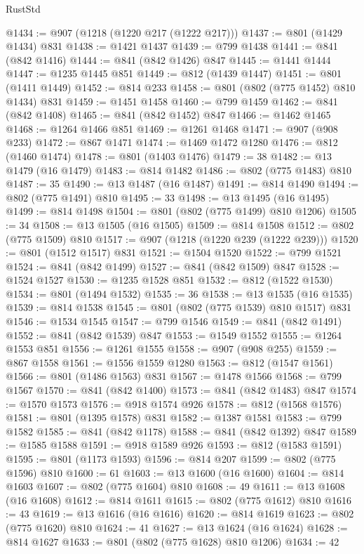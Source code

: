 \begin{lexlean}{RustStd}
\begin{coremodule}
@1434 := @907 (@1218 (@1220 @217 (@1222 @217)))
@1437 := @801 (@1429 @1434) @831
@1438 := @1421 @1437
@1439 := @799 @1438
@1441 := @841 (@842 @1416)
@1444 := @841 (@842 @1426) @847
@1445 := @1441 @1444
@1447 := @1235 @1445 @851
@1449 := @812 (@1439 @1447)
@1451 := @801 (@1411 @1449)
@1452 := @814 @233
@1458 := @801 (@802 (@775 @1452) @810 @1434) @831
@1459 := @1451 @1458
@1460 := @799 @1459
@1462 := @841 (@842 @1408)
@1465 := @841 (@842 @1452) @847
@1466 := @1462 @1465
@1468 := @1264 @1466 @851
@1469 := @1261 @1468
@1471 := @907 (@908 @233)
@1472 := @867 @1471
@1474 := @1469 @1472 @1280
@1476 := @812 (@1460 @1474)
@1478 := @801 (@1403 @1476)
@1479 := 38
@1482 := @13 @1479 (@16 @1479)
@1483 := @814 @1482
@1486 := @802 (@775 @1483) @810
@1487 := 35
@1490 := @13 @1487 (@16 @1487)
@1491 := @814 @1490
@1494 := @802 (@775 @1491) @810
@1495 := 33
@1498 := @13 @1495 (@16 @1495)
@1499 := @814 @1498
@1504 := @801 (@802 (@775 @1499) @810 @1206)
@1505 := 34
@1508 := @13 @1505 (@16 @1505)
@1509 := @814 @1508
@1512 := @802 (@775 @1509) @810
@1517 := @907 (@1218 (@1220 @239 (@1222 @239)))
@1520 := @801 (@1512 @1517) @831
@1521 := @1504 @1520
@1522 := @799 @1521
@1524 := @841 (@842 @1499)
@1527 := @841 (@842 @1509) @847
@1528 := @1524 @1527
@1530 := @1235 @1528 @851
@1532 := @812 (@1522 @1530)
@1534 := @801 (@1494 @1532)
@1535 := 36
@1538 := @13 @1535 (@16 @1535)
@1539 := @814 @1538
@1545 := @801 (@802 (@775 @1539) @810 @1517) @831
@1546 := @1534 @1545
@1547 := @799 @1546
@1549 := @841 (@842 @1491)
@1552 := @841 (@842 @1539) @847
@1553 := @1549 @1552
@1555 := @1264 @1553 @851
@1556 := @1261 @1555
@1558 := @907 (@908 @255)
@1559 := @867 @1558
@1561 := @1556 @1559 @1280
@1563 := @812 (@1547 @1561)
@1566 := @801 (@1486 @1563) @831
@1567 := @1478 @1566
@1568 := @799 @1567
@1570 := @841 (@842 @1400)
@1573 := @841 (@842 @1483) @847
@1574 := @1570 @1573
@1576 := @918 @1574 @926
@1578 := @812 (@1568 @1576)
@1581 := @801 (@1395 @1578) @831
@1582 := @1387 @1581
@1583 := @799 @1582
@1585 := @841 (@842 @1178)
@1588 := @841 (@842 @1392) @847
@1589 := @1585 @1588
@1591 := @918 @1589 @926
@1593 := @812 (@1583 @1591)
@1595 := @801 (@1173 @1593)
@1596 := @814 @207
@1599 := @802 (@775 @1596) @810
@1600 := 61
@1603 := @13 @1600 (@16 @1600)
@1604 := @814 @1603
@1607 := @802 (@775 @1604) @810
@1608 := 49
@1611 := @13 @1608 (@16 @1608)
@1612 := @814 @1611
@1615 := @802 (@775 @1612) @810
@1616 := 43
@1619 := @13 @1616 (@16 @1616)
@1620 := @814 @1619
@1623 := @802 (@775 @1620) @810
@1624 := 41
@1627 := @13 @1624 (@16 @1624)
@1628 := @814 @1627
@1633 := @801 (@802 (@775 @1628) @810 @1206)
@1634 := 42

\end{coremodule}
\end{lexlean}
